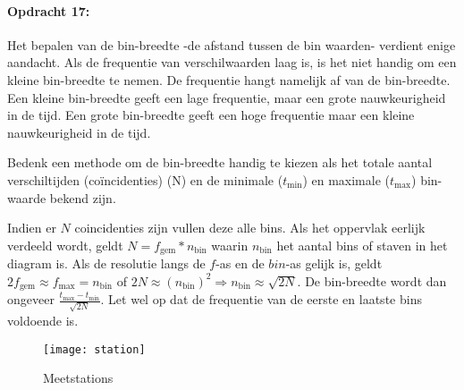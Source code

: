 \bigskip{}
\begin{minipage}[t]{1\columnwidth}%

\paragraph{Opdracht 17:}

Het bepalen van de bin-breedte -de afstand tussen de bin waarden-
verdient enige aandacht. Als de frequentie van verschilwaarden laag
is, is het niet handig om een kleine bin-breedte te nemen. De frequentie
hangt namelijk af van de bin-breedte. Een kleine bin-breedte geeft
een lage frequentie, maar een grote nauwkeurigheid in de tijd. Een
grote bin-breedte geeft een hoge frequentie maar een kleine nauwkeurigheid
in de tijd.

Bedenk een methode om de bin-breedte handig te kiezen als
het totale aantal verschiltijden (coïncidenties) (N) en de minimale
($t_\textrm{min}$) en maximale ($t_\textrm{max}$) bin-waarde bekend zijn.

Indien er $N$ coincidenties zijn vullen deze alle bins. Als het oppervlak
eerlijk verdeeld wordt, geldt $N=f_\textrm{gem}*n_\textrm{bin}$ waarin $n_\textrm{bin}$
het aantal bins of staven in het diagram is. Als de resolutie langs
de $f$-as en de $bin$-as gelijk is, geldt $2f_\textrm{gem}\approx f_\textrm{max}=n_\textrm{bin}$
of $2N\approx\left(n_\textrm{bin}\right)^{2}\Rightarrow n_\textrm{bin}\approx\sqrt{2N}$.
De bin-breedte wordt dan ongeveer $\frac{t_\textrm{max}-t_\textrm{min}}{\sqrt{2N}}$.
Let wel op dat de frequentie van de eerste en laatste bins voldoende
is. %
\end{minipage}

\bigskip{}

\begin{figure}[p]
    \centering
    \texttt{[image: station]}
    \caption{\label{fig:Meetstations}Meetstations}
\end{figure}


